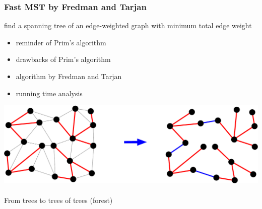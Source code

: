 \documentclass[titlepage,german,presentation]{beamer}
\begin{document}
\begin{frame}
\frametitle{Fast MST by Fredman and Tarjan}

\begin{block}{}
find a spanning tree of an edge-weighted graph with minimum total edge weight 
\end{block}

\begin{itemize}
\item reminder of Prim's algorithm~\cite{krumke09}
\item drawbacks of Prim's algorithm~\cite{krumke09,Eisner97}
\item algorithm by Fredman and Tarjan~\cite{krumke09,Eisner97}
\item running time analysis~\cite{krumke09}
\end{itemize}

\begin{center}
\includegraphics[height=0.2\textwidth]{FredmanTarjan}\\
~\\
From trees to trees of trees (forest)
\end{center}

\end{frame}
\end{document}
